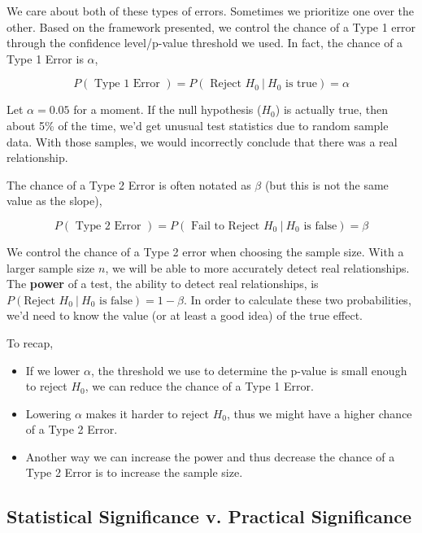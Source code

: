 \documentclass[
]{book}
\providecommand{\tightlist}{%
  \setlength{\itemsep}{0pt}\setlength{\parskip}{0pt}}
\begin{document}
We care about both of these types of errors. Sometimes we prioritize one over the other. Based on the framework presented, we control the chance of a Type 1 error through the confidence level/p-value threshold we used. In fact, the chance of a Type 1 Error is \(\alpha\),

\[P(\text{ Type 1 Error }) = P(\text{ Reject }H_0 ~|~H_0\text{ is true} ) =  \alpha\]

Let \(\alpha = 0.05\) for a moment. If the null hypothesis (\(H_0\)) is actually true, then about 5\% of the time, we'd get unusual test statistics due to random sample data. With those samples, we would incorrectly conclude that there was a real relationship.

The chance of a Type 2 Error is often notated as \(\beta\) (but this is not the same value as the slope),

\[P(\text{ Type 2 Error }) = P(\text{ Fail to Reject }H_0 ~|~H_0\text{ is false} ) =  \beta\]

We control the chance of a Type 2 error when choosing the sample size. With a larger sample size \(n\), we will be able to more accurately detect real relationships. The \textbf{power} of a test, the ability to detect real relationships, is \(P(\text{Reject }H_0 ~|~H_0\text{ is false}) = 1 - \beta\). In order to calculate these two probabilities, we'd need to know the value (or at least a good idea) of the true effect.

To recap,

\begin{itemize}
\tightlist
\item
  If we lower \(\alpha\), the threshold we use to determine the p-value is small enough to reject \(H_0\), we can reduce the chance of a Type 1 Error.
\item
  Lowering \(\alpha\) makes it harder to reject \(H_0\), thus we might have a higher chance of a Type 2 Error.
\item
  Another way we can increase the power and thus decrease the chance of a Type 2 Error is to increase the sample size.
\end{itemize}

\hypertarget{statistical-significance-v.-practical-significance}{%
\subsection{Statistical Significance v. Practical Significance}\label{statistical-significance-v.-practical-significance}}
\end{document}

